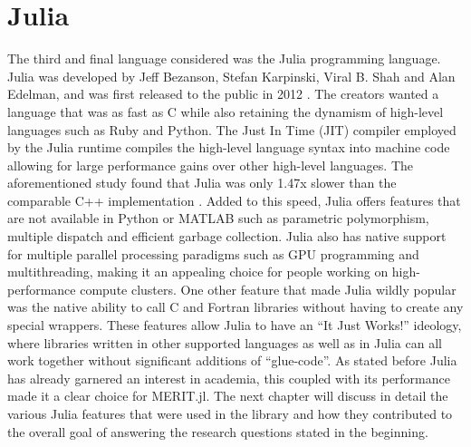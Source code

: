 \section{Julia}
The third and final language considered was the Julia programming language. Julia was developed by Jeff Bezanson, Stefan
Karpinski, Viral B. Shah and Alan Edelman, and was first released to the public in 2012 \cite{bezansonWhyWeCreated12}.
The creators wanted a language that was as fast as C while also retaining the dynamism of high-level languages such as
Ruby and Python. The Just In Time (JIT) compiler employed by the Julia runtime compiles the high-level language syntax
into machine code allowing for large performance gains over other high-level languages. The aforementioned study found
that Julia was only 1.47x slower than the comparable C++ implementation \cite{aruobaComparisonProgrammingLanguages2018}.
Added to this speed, Julia offers features that are not available in Python or MATLAB such as parametric polymorphism,
multiple dispatch and efficient garbage collection. Julia also has native support for multiple parallel processing
paradigms such as GPU programming and multithreading, making it an appealing choice for people working on
high-performance compute clusters. One other feature that made Julia wildly popular was the native ability to call C and
Fortran libraries without having to create any special wrappers. These features allow Julia to have an ``It Just
Works!'' ideology, where libraries written in other supported languages as well as in Julia can all work together
without significant additions of ``glue-code''. As stated before Julia has already garnered an interest in academia,
this coupled with its performance made it a clear choice for MERIT.jl. The next chapter will discuss in detail the
various Julia features that were used in the library and how they contributed to the overall goal of answering the
research questions stated in the beginning.   